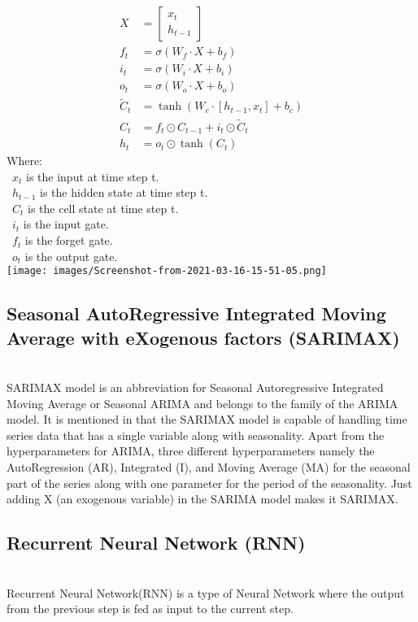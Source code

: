 \documentclass{ieeeojies}
\begin{document}
\begin{align*}
X &= \begin{bmatrix}
    x_t \\
    h_{t-1}
\end{bmatrix} \\
f_t &= \sigma(W_f \cdot X + b_f) \\
i_t &= \sigma(W_i \cdot X + b_i) \\
o_t &= \sigma(W_o \cdot X + b_o) \\
\tilde{C}_t &= \tanh(W_c \cdot [h_{t-1}, x_t] + b_c) \\
C_t &= f_t \odot C_{t-1} + i_t \odot \tilde{C}_t \\
h_t &= o_t \odot \tanh(C_t)
\end{align*}
Where:\\
\indent \textbullet\ \(x_t\) is the input at time step t.\\
\indent \textbullet\ \(h_{t-1}\) is the hidden state at time step t.\\
\indent \textbullet\ \(C_t\) is the cell state at time step t.\\
\indent \textbullet\ \(i_t\) is the input gate.\\
\indent \textbullet\ \(f_t\) is the forget gate.\\
\indent \textbullet\ \(o_t\) is the output gate.\\
\texttt{[image: images/Screenshot-from-2021-03-16-15-51-05.png]}
\subsection{Seasonal AutoRegressive Integrated Moving Average with eXogenous
factors (SARIMAX)}\\
SARIMAX model is an abbreviation for Seasonal Autoregressive Integrated Moving Average or Seasonal ARIMA and belongs to the family of the ARIMA model. It is mentioned in that the SARIMAX model is capable of handling time series data that has a single variable along with seasonality. Apart from the hyperparameters for ARIMA, three different hyperparameters namely the AutoRegression (AR), Integrated (I), and Moving Average (MA) for the seasonal part of the series along with one parameter for the period of the seasonality. Just adding X (an exogenous variable) in the SARIMA model makes it SARIMAX. 
\subsection{Recurrent Neural Network (RNN)}\\
Recurrent Neural Network(RNN) is a type of Neural Network where the output from the previous step is fed as input to the current step.
\end{document}

